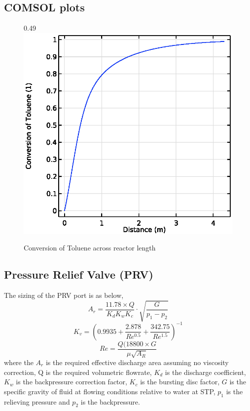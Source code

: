 \subsection{COMSOL plots}
    \begin{figure}{0.49\linewidth}
        \includegraphics[width=\linewidth, scale=0.5]{figures/conversion-line.eps}
        \caption{Conversion of Toluene across reactor length}
        \label{fig:comsol-conversion:line}
    \end{figure}

\subsection{Pressure Relief Valve (PRV)}
The sizing of the PRV port is as below,
\begin{equation}
    A_r = \frac{11.78 \times Q}{K_d K_w K_c} \cdot \sqrt{\frac{G}{p_1-p_2}}
\end{equation}
\begin{equation}
    K_v = (0.9935 + \frac{2.878}{Re^{0.5}} + \frac{342.75}{Re^{1.5}})^{-1}
\end{equation}
\begin{equation}
    Re = \frac{Q(18800 \times G}{\mu \sqrt{A_R}}
\end{equation}
where the $A_r$ is the required effective discharge area assuming no viscosity correction, Q is the required volumetric flowrate, $K_d$ is the discharge coefficient, $K_w$ is the backpressure correction factor, $K_c$ is the bursting disc factor, $G$ is the specific gravity of fluid at flowing conditions relative to water at STP, $p_1$ is the relieving pressure and $p_2$ is the backpressure. 


